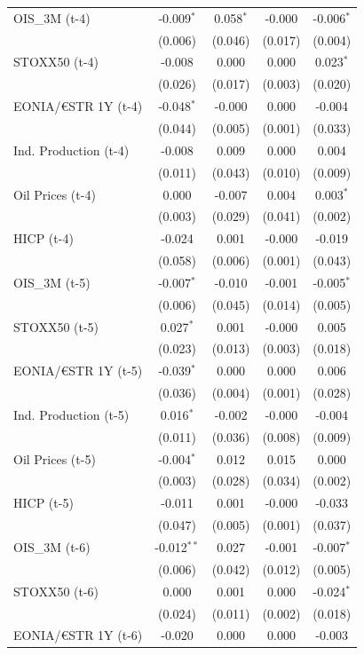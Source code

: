 \begin{longtable}[t]{lcccc}
OIS\_3M (t-4) & -0.009$^{*}$ & 0.058$^{*}$ & -0.000 & -0.006$^{*}$\\
 & (0.006) & (0.046) & (0.017) & (0.004)\\
STOXX50 (t-4) & -0.008 & 0.000 & 0.000 & 0.023$^{*}$\\
 & (0.026) & (0.017) & (0.003) & (0.020)\\
EONIA/€STR 1Y (t-4) & -0.048$^{*}$ & -0.000 & 0.000 & -0.004\\
 & (0.044) & (0.005) & (0.001) & (0.033)\\
Ind. Production (t-4) & -0.008 & 0.009 & 0.000 & 0.004\\
 & (0.011) & (0.043) & (0.010) & (0.009)\\
Oil Prices (t-4) & 0.000 & -0.007 & 0.004 & 0.003$^{*}$\\
 & (0.003) & (0.029) & (0.041) & (0.002)\\
HICP (t-4) & -0.024 & 0.001 & -0.000 & -0.019\\
 & (0.058) & (0.006) & (0.001) & (0.043)\\
OIS\_3M (t-5) & -0.007$^{*}$ & -0.010 & -0.001 & -0.005$^{*}$\\
 & (0.006) & (0.045) & (0.014) & (0.005)\\
STOXX50 (t-5) & 0.027$^{*}$ & 0.001 & -0.000 & 0.005\\
 & (0.023) & (0.013) & (0.003) & (0.018)\\
EONIA/€STR 1Y (t-5) & -0.039$^{*}$ & 0.000 & 0.000 & 0.006\\
 & (0.036) & (0.004) & (0.001) & (0.028)\\
Ind. Production (t-5) & 0.016$^{*}$ & -0.002 & -0.000 & -0.004\\
 & (0.011) & (0.036) & (0.008) & (0.009)\\
Oil Prices (t-5) & -0.004$^{*}$ & 0.012 & 0.015 & 0.000\\
 & (0.003) & (0.028) & (0.034) & (0.002)\\
HICP (t-5) & -0.011 & 0.001 & -0.000 & -0.033\\
 & (0.047) & (0.005) & (0.001) & (0.037)\\
OIS\_3M (t-6) & -0.012$^{**}$ & 0.027 & -0.001 & -0.007$^{*}$\\
 & (0.006) & (0.042) & (0.012) & (0.005)\\
STOXX50 (t-6) & 0.000 & 0.001 & 0.000 & -0.024$^{*}$\\
 & (0.024) & (0.011) & (0.002) & (0.018)\\
EONIA/€STR 1Y (t-6) & -0.020 & 0.000 & 0.000 & -0.003\\

\end{longtable}
